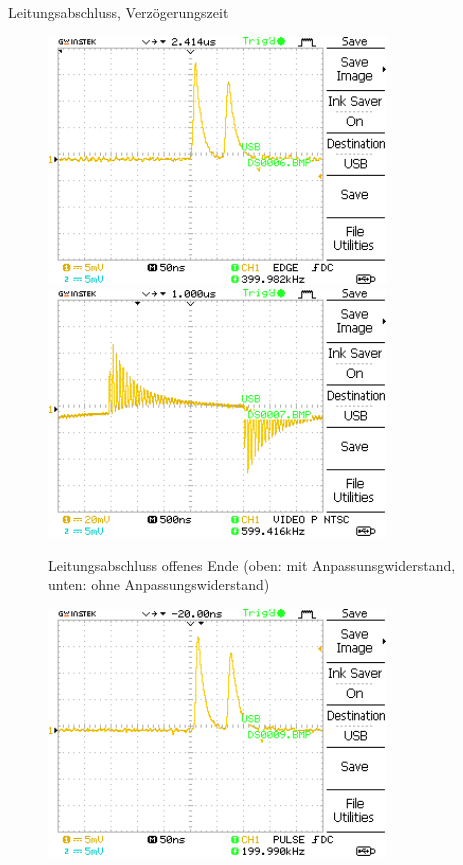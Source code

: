 \documentclass[ngerman]{scrartcl}
\theoremstyle{definition}
\begin{document}
\begin{aufgabe}{Leitungsabschluss, Verzögerungszeit}
\begin{unteraufgabe}
\begin{figure}[H]
					\centering
					\includegraphics[width=0.8\textwidth]{MesswerteVersuch1/DS0006.png}
					\includegraphics[width=0.8\textwidth]{MesswerteVersuch1/DS0007.png}
					\caption{Leitungsabschluss offenes Ende (oben: mit Anpassunsgwiderstand, unten: ohne Anpassungswiderstand)}
					\label{fig:DS0006,7}
				\end{figure}
			\end{unteraufgabe}
			\begin{unteraufgabe}
				\begin{figure}[H]
					\centering
					\includegraphics[width=0.8\textwidth]{MesswerteVersuch1/DS0009.png}

\end{figure}
\end{unteraufgabe}
\end{aufgabe}
\end{document}
